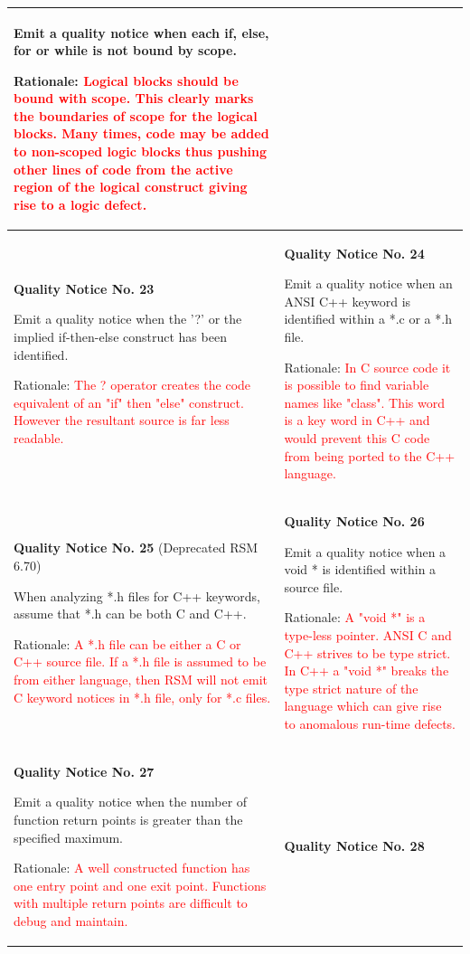 {\begin{longtable}{||p{}|p{}||}
Emit a quality notice when each if, else, for
or while is not bound by scope.

Rationale:  \textcolor{red}{Logical blocks should be bound with scope.  This clearly marks the boundaries of scope for the logical blocks.  Many times, code may be added to non-scoped logic blocks thus pushing other lines of code from the active region of the logical construct giving rise to a logic defect.}
    \\
    \hline 
    \textbf{Quality Notice No. 23}
    
Emit a quality notice when the '?' or the implied
if-then-else construct has been identified.

Rationale:  \textcolor{red}{The ? operator creates the code equivalent of an "if" then "else" construct.  However the resultant source is far less readable.}
 & \textbf{Quality Notice No. 24}
 
Emit a quality notice when an ANSI C++ keyword is identified within a *.c or a *.h file.

Rationale: \textcolor{red}{ In C source code it is possible to find variable names like "class".  This word is a key word in C++ and would prevent this C code from being ported to the C++ language.}
    \\
    \hline
\textbf{Quality Notice No. 25} (Deprecated RSM 6.70) 

When analyzing *.h files for C++ keywords,
assume that *.h can be both C and C++.

Rationale: \textcolor{red}{ A *.h file can be either a C or C++ source file.  If a *.h file is assumed to be from either language, then RSM will not emit C keyword notices in *.h file, only for *.c files.}
 & \textbf{Quality Notice No. 26}
 
Emit a quality notice when a void * is identified
within a source file.

Rationale:  \textcolor{red}{A "void *" is a type-less pointer.  ANSI C and C++ strives to be type strict.  In C++ a "void *" breaks the type strict nature of the language which can give rise to anomalous run-time defects.}
    \\
    \hline
    \textbf{Quality Notice No. 27}
    
Emit a quality notice when the number of function return points is greater than the specified maximum.

Rationale:  \textcolor{red}{A well constructed function has one entry point and one exit point.  Functions with multiple return points are difficult to debug and maintain.}
 & \textbf{Quality Notice No. 28}
 

\end{longtable}}
